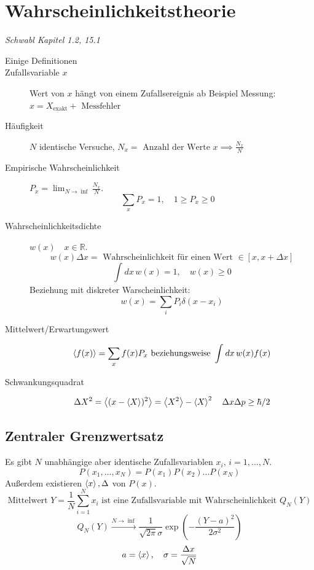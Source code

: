 \documentclass[11pt]{article}
\theoremstyle{plain}
\newcommand{\R}{\mathbb{R}}
\begin{document}
\section{Wahrscheinlichkeitstheorie}
\emph{Schwabl Kapitel 1.2, 15.1} \\
\begin{description}
  \item [Einige Definitionen]

  \item [Zufallsvariable $x$] Wert von $x$ h\"angt von einem Zufallsereignis ab
    Beispiel Messung: $x= X_{\text{exakt}} + \text{ Messfehler }$

  \item[H\"aufigkeit] 
    $N$ identische Versuche, $N_x = \text{ Anzahl der Werte } x \implies \frac{N_x}{N}$

  \item[Empirische Wahrscheinlichkeit]
    $P_x = \lim_{N \to \inf } \frac{N_x}{N}$.
    \[ \sum_{x}{} P_x = 1 , \quad 1 \ge P_x \ge 0 \quad \] 

  \item[Wahrscheinlichkeitsdichte] 
    $w(x) \quad x \in \R$. \[ w(x)\Delta x = \text{ Wahrscheinlichkeit f\"ur einen
      Wert } \in [x, x+\Delta x]  \] 
      \[ \int_{}^{}dx\, w(x)=1, \quad w(x)\ge 0 \] 
      Beziehung mit diskreter Warscheinlichkeit: 
      \[ w(x) = \sum_{i}{}P_i \delta ( x-x_i) \] 

  \item[Mittelwert/Erwartungswert]
    \[ \Braket{f(x)} = \sum_{x}{} f(x) P_x \text{ beziehungsweise } \int_{}^{}
      dx\, w(x) f(x)\] 

  \item [Schwankungsquadrat] \[ \Delta X^2 = \Braket{(x-\Braket{X})^2}
    = \Braket{X^2}- \Braket{X}^2 \quad \Delta x \Delta p \ge \hbar/2\] 
\end{description}
\subsection{Zentraler Grenzwertsatz}
Es gibt $N$ unabh\"angige aber identische Zufallsvariablen $x_i, \, i=1 , \dotsc , N$.
\[ P(x_1,\dotsc,x_N)= P(x_1) P(x_2) \ldots P(x_N)  \]
Au\ss{}erdem existieren $\Braket{x},\Delta$ von  $P(x)$.
\[ \text{Mittelwert } Y= \frac{1}{N}\sum_{i=1}^{N}x_i  \text{ ist eine
Zufallsvariable mit Wahrscheinlichkeit } Q_N(Y) \] 
\[ Q_N(Y) \xrightarrow{N\to \inf}\frac{1}{\sqrt{2 \pi} \sigma}
\exp{(-\frac{(Y-a)^2}{2 \sigma^2})}\] 
\[ a=\Braket{x}, \quad \sigma= \frac{\Delta x}{ \sqrt{N}} \] 
\end{document}
